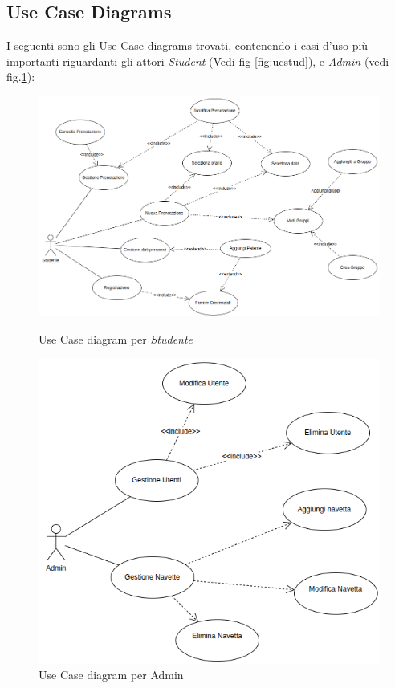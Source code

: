 \subsection{Use Case Diagrams}
I seguenti sono gli Use Case diagrams trovati, contenendo i casi d'uso più importanti riguardanti gli attori \textit{Student} (Vedi fig \ref{fig:ucstud}), e \textit{Admin} (vedi fig.\ref{fig:ucadmin}):
\begin{figure}[H]
    \centering
    \includegraphics[width=1\linewidth]{Images/Student UC.png}
    \caption{Use Case diagram per \textit{Studente}}
    \label{fig:ucstud}

    \vspace{0.5cm}

    \centering
    \includegraphics[width=1\linewidth]{Images/Admin UC diag.png}
    \caption{Use Case diagram per Admin}
    \label{fig:ucadmin}
\end{figure}
